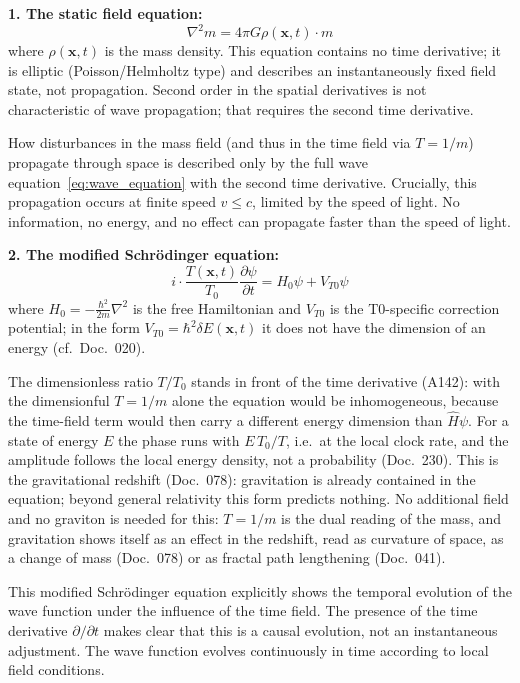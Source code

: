 	\textbf{1. The static field equation:}
	\begin{equation}
		\nabla^2 m = 4\pi G \rho(\mathbf{x},t) \cdot m \label{eq:field_equation}
	\end{equation}
	where $\rho(\mathbf{x},t)$ is the mass density. This equation contains no time derivative; it is elliptic (Poisson/Helmholtz type) and describes an instantaneously fixed field state, not propagation. Second order in the spatial derivatives is not characteristic of wave propagation; that requires the second time derivative.
	
	How disturbances in the mass field (and thus in the time field via $T = 1/m$) propagate through space is described only by the full wave equation~\eqref{eq:wave_equation} with the second time derivative. Crucially, this propagation occurs at finite speed $v \leq c$, limited by the speed of light. No information, no energy, and no effect can propagate faster than the speed of light.
	
	\textbf{2. The modified Schrödinger equation:}
	\begin{equation}
		i \cdot \frac{T(\mathbf{x},t)}{T_0} \frac{\partial \psi}{\partial t} = H_0 \psi + V_{T0} \psi \label{eq:schroedinger}
	\end{equation}
	where $H_0 = -\frac{\hbar^2}{2m}\nabla^2$ is the free Hamiltonian and $V_{T0}$ is the T0-specific correction potential; in the form $V_{T0} = \hbar^2 \delta E(\mathbf{x},t)$ it does not have the dimension of an energy (cf.\ Doc.~020).
	
	The dimensionless ratio $T/T_0$ stands in front of the time derivative (A142): with the dimensionful $T=1/m$ alone the equation would be inhomogeneous, because the time-field term would then carry a different energy dimension than $\hat H\psi$. For a state of energy $E$ the phase runs with $E\,T_0/T$, i.e.\ at the local clock rate, and the amplitude follows the local energy density, not a probability (Doc.~230). This is the gravitational redshift (Doc.~078): gravitation is already contained in the equation; beyond general relativity this form predicts nothing. No additional field and no graviton is needed for this: $T=1/m$ is the dual reading of the mass, and gravitation shows itself as an effect in the redshift, read as curvature of space, as a change of mass (Doc.~078) or as fractal path lengthening (Doc.~041).
	
	This modified Schrödinger equation explicitly shows the temporal evolution of the wave function under the influence of the time field. The presence of the time derivative $\partial/\partial t$ makes clear that this is a causal evolution, not an instantaneous adjustment. The wave function evolves continuously in time according to local field conditions.
	
